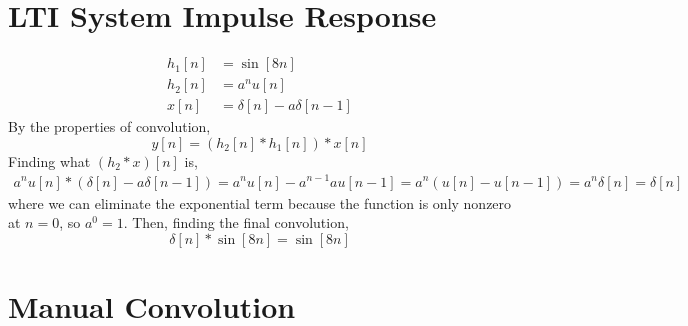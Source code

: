 \documentclass{article}
\begin{document}
\section{LTI System Impulse Response}

\begin{align}
    h_1[n] &= \sin[8n] \\
    h_2[n] &= a^n u[n] \\
    x[n] &= \delta[n] - a \delta[n - 1]
\end{align}
By the properties of convolution,
\begin{equation}
    y[n] = (h_2[n] \ast h_1[n]) \ast x[n]
\end{equation}
Finding what \((h_2 \ast x)[n]\) is,
\begin{align}
    a^n u[n] \ast (\delta[n] - a\delta[n - 1]) = a^n u[n] - a^{n - 1} a u[n - 1] = a^n (u[n] - u[n - 1]) = a^n \delta[n] = \delta[n]
\end{align}
where we can eliminate the exponential term because the function is only nonzero at \(n = 0\), so \(a^0 = 1\).
Then, finding the final convolution,
\begin{equation}
    \delta[n] \ast \sin[8n] = \sin[8n]
\end{equation}

\section{Manual Convolution}

\subsection{}
\end{document}

